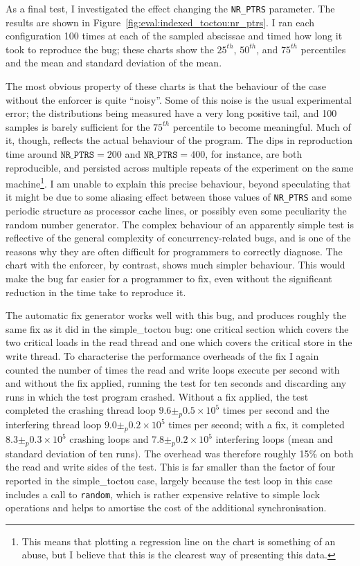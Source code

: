 As a final test, I investigated the effect changing the
\texttt{NR\_PTRS} parameter.  The results are shown in
Figure~\ref{fig:eval:indexed_toctou:nr_ptrs}.  I ran each
configuration 100 times at each of the sampled abscissae and timed how
long it took to reproduce the bug; these charts show the $25^{th}$,
$50^{th}$, and $75^{th}$ percentiles and the mean and standard
deviation of the mean.

The most obvious property of these charts is that the behaviour of the
case without the enforcer is quite ``noisy''.  Some of this noise is
the usual experimental error; the distributions being measured have a
very long positive tail, and 100 samples is barely sufficient for the
$75^{th}$ percentile to become meaningful.  Much of it, though,
reflects the actual behaviour of the program.  The dips in
reproduction time around $\texttt{NR\_PTRS} = 200$ and
$\texttt{NR\_PTRS} = 400$, for instance, are both reproducible, and
persisted across multiple repeats of the experiment on the same
machine\footnote{This means that plotting a regression line on the
  chart is something of an abuse, but I believe that this is the
  clearest way of presenting this data.}.  I am unable to explain this
precise behaviour, beyond speculating that it might be due to some
aliasing effect between those values of \texttt{NR\_PTRS} and some
periodic structure as processor cache lines, or possibly even some
peculiarity the random number generator.  The complex behaviour of an
apparently simple test is reflective of the general complexity of
concurrency-related bugs, and is one of the reasons why they are often
difficult for programmers to correctly diagnose\needCite{}.  The chart
with the enforcer, by contrast, shows much simpler behaviour.  This
would make the bug far easier for a programmer to fix, even without
the significant reduction in the time take to reproduce it.

The automatic fix generator works well with this bug, and produces
roughly the same fix as it did in the simple\_toctou bug: one critical
section which covers the two critical loads in the read thread and one
which covers the critical store in the write thread.  To characterise
the performance overheads of the fix I again counted the number of
times the read and write loops execute per second with and without the
fix applied, running the test for ten seconds and discarding any runs
in which the test program crashed.  Without a fix applied, the test
completed the crashing thread loop $9.6 \pm_p 0.5 {\times} 10^5$ times
per second and the interfering thread loop $9.0 \pm_p 0.2 {\times}
10^5$ times per second; with a fix, it completed $8.3 \pm_p 0.3 \times
10^5$ crashing loops and $7.8 \pm_p 0.2 \times 10^5$ interfering loops
(mean and standard deviation of ten runs).  The overhead was therefore
roughly 15\% on both the read and write sides of the test.  This is
far smaller than the factor of four reported in the simple\_toctou
case, largely because the test loop in this case includes a call to
\verb|random|, which is rather expensive relative to simple lock
operations and helps to amortise the cost of the additional
synchronisation.

